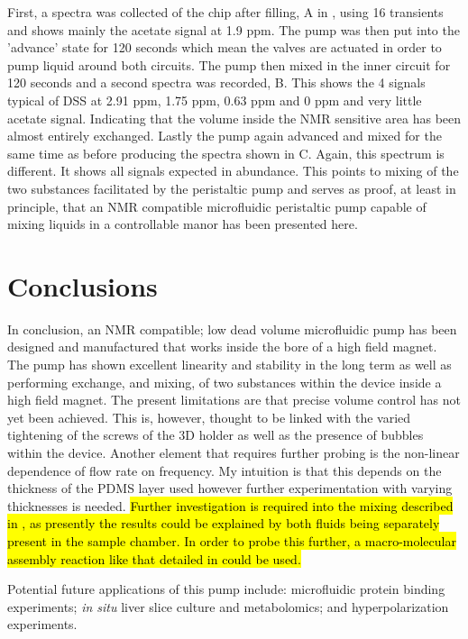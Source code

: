 First, a spectra was collected of the chip after filling, A in , using 16
transients and shows mainly the acetate signal at 1.9 ppm. The pump was then put into
the 'advance' state for 120 seconds which mean the valves are actuated in order to pump
liquid around both circuits. The pump then mixed in the inner circuit for 120 seconds
and a second spectra was recorded, B. This shows the 4 signals typical of DSS at 2.91
ppm, 1.75 ppm, 0.63 ppm and 0 ppm and very little acetate signal. Indicating that the
volume inside the NMR sensitive area has been almost entirely exchanged. Lastly the
pump again advanced and mixed for the same time as before producing the spectra shown
in C. Again, this spectrum is different. It shows all signals expected in abundance.
This points to mixing of the two substances facilitated by the peristaltic pump and serves
as proof, at least in principle, that an NMR compatible microfluidic peristaltic pump
capable of mixing liquids in a controllable manor has been presented here.

\section{Conclusions}

In conclusion, an NMR compatible; low dead volume microfluidic pump has been designed and
manufactured that works inside the bore of a high field magnet. The pump has shown
excellent linearity and stability in the long term as well as performing exchange, and
mixing, of two substances within the device inside a high field magnet. The present limitations
are that precise volume control has not yet been achieved. This is, however, thought to be linked
with the varied tightening of the screws of the 3D holder as well as the presence of bubbles
within the device. Another element that requires further probing is the non-linear dependence of
flow rate on frequency. My intuition is that this depends on the thickness of the PDMS layer
used however further experimentation with varying thicknesses is needed. \hl{Further investigation
is required into the mixing described in , as presently the results could be explained
by both fluids being separately present in the sample chamber. In order to probe this further, a macro-molecular
assembly reaction like that detailed in \citep{fang2018probing} could be used.}

Potential future applications of this pump include: microfluidic protein binding experiments;
\textit{in situ} liver slice culture and metabolomics; and hyperpolarization experiments.

